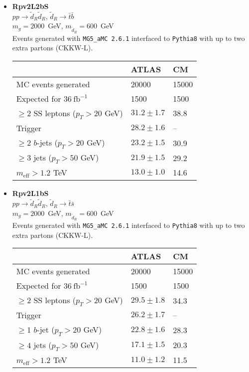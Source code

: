 \documentclass[10pt,fleqn]{article}
\newcommand{\meff}{m_\mathrm{eff}}
\begin{document}
\begin{itemize}
\item \textbf{Rpv2L2bS}\\ $ p p \to \tilde{d}_R \tilde{d}_R $, $\tilde{d}_R \to \bar{t} \bar{b}$\\
 $m_{g} = 2000$~GeV, $m_{\tilde{d}_R} = 600$~GeV\\
 Events generated with \texttt{MG5\_aMC 2.6.1} interfaced to \texttt{Pythia8} with up to two extra partons (CKKW-L).
 \begin{tabular}{l|p{3cm}|p{3cm}} \toprule
                                           &  ATLAS           & CM  \\ \midrule
 MC events generated                       &  20000          & 15000 \\ \midrule
 Expected for $36\ \mathrm{fb}^{-1}$       &  1500            & 1500  \\
 $\geq 2$ SS leptons ($p_T > 20$ GeV)      & $31.2\pm 1.7$   & 38.8  \\
 Trigger                                   & $28.2 \pm 1.6$   &  --\\
 $\geq 2$ $b$-jets ($p_T > 20$ GeV)         & $23.2 \pm 1.5$   &  30.9\\
 $\geq 3$ jets ($p_T > 50$ GeV)            & $21.9 \pm 1.5$   &  29.2\\
 $\meff  > 1.2$ TeV                         & $13.0 \pm 1.0$   &  14.6\\   \bottomrule 
 \end{tabular}        

\item \textbf{Rpv2L1bS}\\ $ p p \to \tilde{d}_R \tilde{d}_R $, $\tilde{d}_R \to \bar{t} \bar{s}$\\
 $m_{g} = 2000$~GeV, $m_{\tilde{d}_R} = 600$~GeV\\
 Events generated with \texttt{MG5\_aMC 2.6.1} interfaced to \texttt{Pythia8} with up to two extra partons (CKKW-L).
 \begin{tabular}{l|p{3cm}|p{3cm}} \toprule
                                           &  ATLAS           & CM  \\ \midrule
 MC events generated                       &  20000          & 15000 \\ \midrule
 Expected for $36\ \mathrm{fb}^{-1}$       &  1500            & 1500  \\
 $\geq 2$ SS leptons ($p_T > 20$ GeV)      & $29.5\pm 1.8$   & 34.3  \\
 Trigger                                   & $26.2 \pm 1.7$   &  --\\
 $\geq 1$ $b$-jet ($p_T > 20$ GeV)         & $22.8 \pm 1.6$   &  28.3\\
 $\geq 4$ jets ($p_T > 50$ GeV)            & $17.1 \pm 1.5$   &  20.3\\
 $\meff  > 1.2$ TeV                         & $11.0 \pm 1.2$   &  11.5\\   \bottomrule 
 \end{tabular}         
 

\end{itemize}
\end{document}
